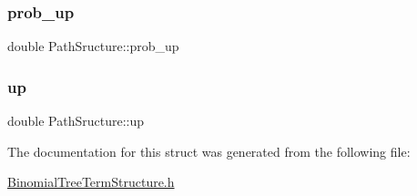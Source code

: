 \hypertarget{structPathSructure_ac2c24fe1ce2620e12509b75ccfae96bc}{}\label{structPathSructure_ac2c24fe1ce2620e12509b75ccfae96bc} 
\subsubsection{\texorpdfstring{prob\+\_\+up}{prob\_up}}
{\footnotesize\ttfamily double Path\+Sructure\+::prob\+\_\+up}

\hypertarget{structPathSructure_aca3d1c12b68ccb0d07a0e2abc6f4289f}{}\label{structPathSructure_aca3d1c12b68ccb0d07a0e2abc6f4289f} 
\subsubsection{\texorpdfstring{up}{up}}
{\footnotesize\ttfamily double Path\+Sructure\+::up}



The documentation for this struct was generated from the following file\+:\begin{DoxyCompactItemize}
\item 
\hyperlink{BinomialTreeTermStructure_8h}{Binomial\+Tree\+Term\+Structure.\+h}\end{DoxyCompactItemize}
